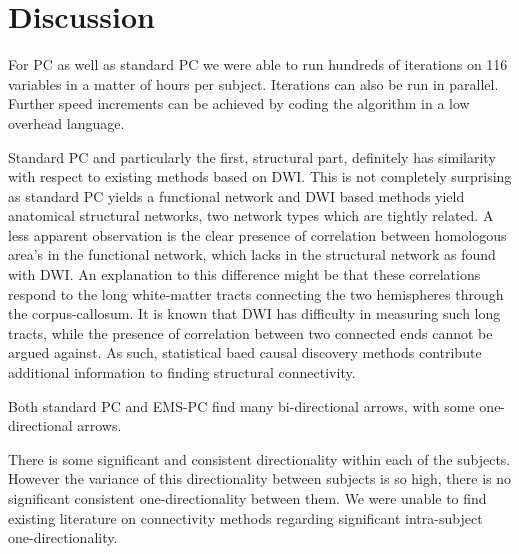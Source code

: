 \documentclass[a4paper, 10pt, english, onecolumn]{article}
\begin{document}

\section{Discussion}



For PC as well as standard PC we were able to run hundreds of iterations on 116 variables in a matter of hours per subject.
Iterations can also be run in parallel.
Further speed increments can be achieved by coding the algorithm in a low overhead language.

Standard PC and particularly the first, structural part, definitely has similarity with respect to existing methods based on DWI.
This is not completely surprising as standard PC yields a functional network and DWI based methods yield anatomical structural networks, two network types which are tightly related.
A less apparent observation is the clear presence of correlation between homologous area's in the functional network, which lacks in the structural network as found with DWI.
An explanation to this difference might be that these correlations respond to the long white-matter tracts connecting the two hemispheres through the corpus-callosum.
It is known that DWI has difficulty in measuring such long tracts, while the presence of correlation between two connected ends cannot be argued against.
As such, statistical baed causal discovery methods contribute additional information to finding structural connectivity.

Both standard PC and EMS-PC find many bi-directional arrows, with some one-directional arrows.

There is some significant and consistent directionality within each of the subjects.
However the variance of this directionality between subjects is so high, there is no significant consistent one-directionality between them.
We were unable to find existing literature on connectivity methods regarding significant intra-subject one-directionality.
\end{document}
